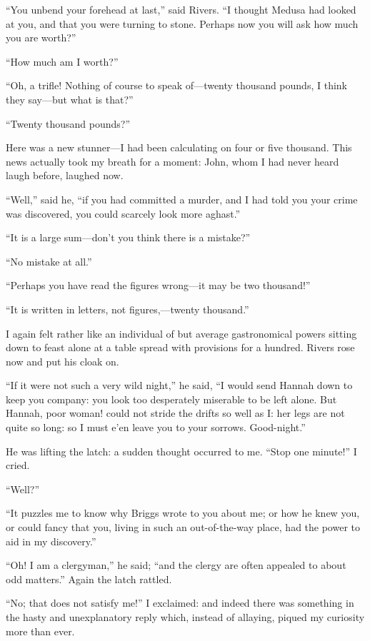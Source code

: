 \enquote{You unbend your forehead at last,} said \Mr{} Rivers. \enquote{I
	thought Medusa had looked at you, and that you were turning to stone.
	Perhaps now you will ask how much you are worth?}

\enquote{How much am I worth?}

\enquote{Oh, a trifle! Nothing of course to speak of---twenty thousand
	pounds, I think they say---but what is that?}

\enquote{Twenty thousand pounds?}

Here was a new stunner---I had been calculating on four or five
thousand. This news actually took my breath for a moment: \Mr{} \St{} John,
whom I had never heard laugh before, laughed now.

\enquote{Well,} said he, \enquote{if you had committed a murder, and I
	had told you your crime was discovered, you could scarcely look more
	aghast.}

\enquote{It is a large sum---don't you think there is a mistake?}

\enquote{No mistake at all.}

\enquote{Perhaps you have read the figures wrong---it may be two
	thousand!}

\enquote{It is written in letters, not figures,---twenty thousand.}

I again felt rather like an individual of but average gastronomical
powers sitting down to feast alone at a table spread with provisions for
a hundred. \Mr{} Rivers rose now and put his cloak on.

\enquote{If it were not such a very wild night,} he said, \enquote{I
	would send Hannah down to keep you company: you look too desperately
	miserable to be left alone. But Hannah, poor woman! could not stride
	the drifts so well as I: her legs are not quite so long: so I must e'en
	leave you to your sorrows. Good-night.}

He was lifting the latch: a sudden thought occurred to me.
\enquote{Stop one minute!} I cried.

\enquote{Well?}

\enquote{It puzzles me to know why \Mr{} Briggs wrote to you about me; or
	how he knew you, or could fancy that you, living in such an
	out-of-the-way place, had the power to aid in my discovery.}

\enquote{Oh! I am a clergyman,} he said; \enquote{and the clergy are
	often appealed to about odd matters.} Again the latch rattled.

\enquote{No; that does not satisfy me!} I exclaimed: and indeed there
was something in the hasty and unexplanatory reply which, instead of
allaying, piqued my curiosity more than ever.

